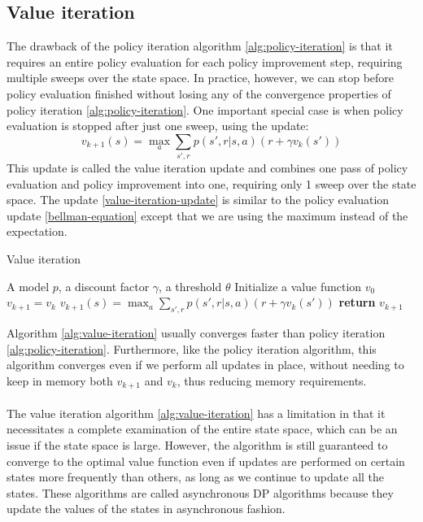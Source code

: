 \subsection{Value iteration}
The drawback of the policy iteration algorithm \ref{alg:policy-iteration} is that it requires an entire policy evaluation for each policy improvement step, requiring multiple sweeps over the state space. In practice, however, we can stop before policy evaluation finished without losing any of the convergence properties of policy iteration \ref{alg:policy-iteration}. One important special case is when policy evaluation is stopped after just one sweep, using the update:
\begin{equation}
    v_{k+1}(s) = \max_a \sum_{s', r} p(s', r | s, a) (r + \gamma v_k(s'))
    \label{value-iteration-update}
\end{equation}
This update is called the value iteration update and combines one pass of policy evaluation and policy improvement into one, requiring only 1 sweep over the state space. The update \ref{value-iteration-update} is similar to the policy evaluation update \ref{bellman-equation} except that we are using the maximum instead of the expectation.
\begin{algorithm}[H]
    \caption{Value iteration}
    \label{alg:value-iteration}
    \begin{algorithmic}[1]
        \Require A model $p$, a discount factor $\gamma$, a threshold $\theta$
        \State Initialize a value function $v_{0}$
            \State $v_{k+1} = v_k$
                \State $v_{k+1}(s) = \max_a \sum_{s', r} p(s', r | s, a) (r + \gamma v_k(s'))$
            \EndFor
                \State \textbf{return} $v_{k+1}$
            \EndIf
        \EndWhile
    \end{algorithmic}
\end{algorithm}
Algorithm \ref{alg:value-iteration} usually converges faster than policy iteration \ref{alg:policy-iteration}. Furthermore, like the policy iteration algorithm, this algorithm converges even if we perform all updates in place, without needing to keep in memory both $v_{k+1}$ and $v_k$, thus reducing memory requirements.\\\\
The value iteration algorithm \ref{alg:value-iteration} has a limitation in that it necessitates a complete examination of the entire state space, which can be an issue if the state space is large. However, the algorithm is still guaranteed to converge to the optimal value function even if updates are performed on certain states more frequently than others, as long as we continue to update all the states. These algorithms are called asynchronous DP algorithms because they update the values of the states in asynchronous fashion.

